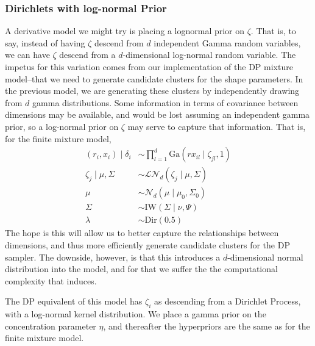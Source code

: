 \subsubsection{Dirichlets with log-normal Prior}
A derivative model we might try is placing a lognormal prior on $\zeta$.  That is, to say, instead
  of having $\zeta$ descend from $d$ independent Gamma random variables, we can have $\zeta$
  descend from a $d$-dimensional log-normal random variable.  The impetus for this variation comes
  from our implementation of the DP mixture model--that we need to generate candidate clusters for
  the shape parameters.  In the previous model, we are generating these clusters by independently
  drawing from $d$ gamma distributions.  Some information in terms of covariance between dimensions
  may be available, and would be lost assuming an independent gamma prior, so a log-normal prior on
  $\zeta$ may serve to capture that information.  That is, for the finite mixture model,
  \begin{equation}
    \label{model:mgdln}
    \begin{aligned}
      (r_i, x_i) \mid \delta_i &\sim \prod_{l = 1}^d\text{Ga}(rx_{il}\mid \zeta_{jl}, 1)\\
        \zeta_{j} \mid \mu, \Sigma &\sim \mathcal{LN}_d\left(\zeta_j\mid\mu,\Sigma\right)\\
        \mu &\sim \mathcal{N}_d\left(\mu\mid\mu_0,\Sigma_0\right)\\
        \Sigma &\sim \text{IW}\left(\Sigma\mid\nu,\Psi\right) \\
        \lambda &\sim \text{Dir}(0.5)
    \end{aligned}
  \end{equation}
  The hope is this will allow us to better capture the relationships between dimensions, and thus
  more efficiently generate candidate clusters for the DP sampler.  The downside, however, is that
  this introduces a $d$-dimensional normal distribution into the model, and for that we suffer the
  the computational complexity that induces.

The DP equivalent of this model has $\zeta_i$ as descending from a Dirichlet Process, with a
  log-normal kernel distribution.  We place a gamma prior on the concentration parameter $\eta$,
  and thereafter the hyperpriors are the same as for the finite mixture model.

